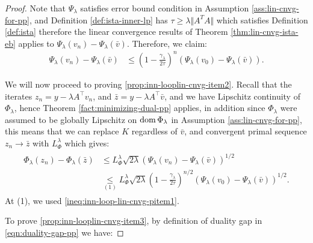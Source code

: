 \documentclass[12pt]{article}
\begin{document}
        \begin{proof}
            Note that $\Psi_\lambda$ satisfies error bound condition in Assumption \ref{ass:lin-cnvg-for-pp}, and Definition \ref{def:ista-inner-lp} has $\tau \ge \lambda\Vert A^TA\Vert$ which satisfies Definition \ref{def:ista} therefore the linear convergence results of Theorem \ref{thm:lin-cnvg-ista-eb} applies to $\Psi_\lambda(v_n) - \Psi_\lambda(\bar v)$. 
            Therefore, we claim: 
            \begin{align}\label{ineq:inn-loop-lin-cnvg-pitem1}
                \Psi_\lambda(v_n) - \Psi_\lambda(\bar v) &\le 
                \left(
                    1 - \frac{\gamma_\lambda}{2\tau}
                \right)^n
                \left(
                    \Psi_\lambda(v_0) - \Psi_\lambda(\bar v)
                \right). 
            \end{align}
            \par
            We will now proceed to proving \ref{prop:inn-looplin-cnvg-item2}. 
            Recall that the iterates $z_n = y - \lambda A^\top v_n$, and $\bar z = y - \lambda A^\top \bar v$, and we have Lipschitz continuity of $\Phi_\lambda$, hence Theorem \ref{fact:minimizing-dual-pp} applies, in addition since $\Phi_\lambda$ were assumed to be globally Lipschitz on $\operatorname{dom} \Phi_\lambda$ in Assumption \ref{ass:lin-cnvg-for-pp}, this means that we can replace $K$ regardless of $\bar v$, and convergent primal sequence $z_n \rightarrow \bar z$ with $L_\Phi^\lambda$ which gives: 
            \begin{align}\label{ineq:inn-loop-lin-cnvg-pitem2}
                \begin{split}
                    \Phi_\lambda(z_n) - \Phi_\lambda(\bar z) &\le L_\Phi^\lambda \sqrt{2\lambda}\left(
                    \Psi_\lambda(v_n) - \Psi_\lambda (\bar v)
                    \right)^{1/2}
                    \\
                    &\underset{(1)}{\le} 
                    L_\Phi^\lambda\sqrt{2\lambda} \left(
                        1 - \frac{\gamma_\lambda}{2\tau}
                    \right)^{n/2}\left(
                        \Psi_\lambda(v_0) - \Psi_\lambda(\bar v)
                    \right)^{1/2}. 
                \end{split}
            \end{align}
            At (1), we used \eqref{ineq:inn-loop-lin-cnvg-pitem1}.
            \par
            To prove \ref{prop:inn-looplin-cnvg-item3}, by definition of duality gap in \eqref{eqn:duality-gap-pp} we have:

\end{proof}
\end{document}
